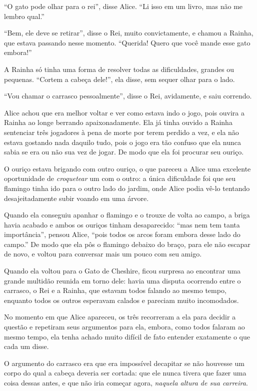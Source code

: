 ``O gato pode olhar para o rei'', disse Alice. ``Li isso em um livro,
mas não me lembro qual.''

``Bem, ele deve se retirar'', disse o Rei, muito convictamente, e chamou
a Rainha, que estava passando nesse momento. ``Querida! Quero que você
mande esse gato embora!''

A Rainha só tinha uma forma de resolver todas as dificuldades, grandes
ou pequenas. ``Cortem a cabeça dele!'', ela disse, sem sequer olhar para
o lado.

``Vou chamar o carrasco pessoalmente'', disse o Rei, avidamente, e saiu
correndo.

Alice achou que era melhor voltar e ver como estava indo o jogo, pois
ouvira a Rainha ao longe berrando apaixonadamente. Ela já tinha ouvido
a Rainha sentenciar três jogadores à pena de morte por terem perdido a
vez, e ela não estava gostando nada daquilo tudo, pois o jogo era tão
confuso que ela nunca sabia se era ou não sua vez de jogar. De modo que
ela foi procurar seu ouriço.

O ouriço estava brigando com outro ouriço, o que pareceu a Alice uma
excelente oportunidade de \textit{croquetear} um com o outro: a única dificuldade
foi que seu flamingo tinha ido para o outro lado do jardim, onde Alice
podia vê-lo tentando desajeitadamente subir voando em uma árvore.

Quando ela conseguiu apanhar o flamingo e o trouxe de volta ao campo, a
briga havia acabado e ambos os ouriços tinham desaparecido: ``mas nem tem tanta
importância'', pensou Alice, ``pois todos os arcos foram embora desse
lado do campo.'' De modo que ela pôs o flamingo debaixo do braço, para
ele não escapar de novo, e voltou para conversar mais um pouco com seu
amigo.

Quando ela voltou para o Gato de Cheshire, ficou surpresa ao encontrar
uma grande multidão reunida em torno dele: havia uma disputa ocorrendo
entre o carrasco, o Rei e a Rainha, que estavam todos falando ao mesmo
tempo, enquanto todos os outros esperavam calados e pareciam muito
incomodados.

No momento em que Alice apareceu, os três recorreram a ela para decidir
a questão e repetiram seus argumentos para ela, embora, como todos
falaram ao mesmo tempo, ela tenha achado muito difícil de fato entender
exatamente o que cada um disse.

O argumento do carrasco era que era impossível decapitar se não houvesse
um corpo do qual a cabeça deveria ser cortada: que ele nunca tivera que
fazer uma coisa dessas antes, e que não iria começar agora,
\emph{naquela altura de sua carreira}.

